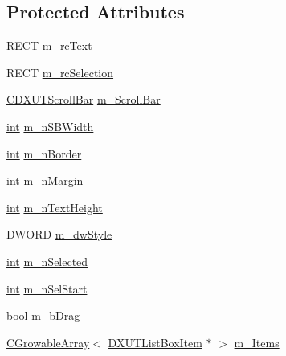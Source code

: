 \subsection*{Protected Attributes}
\begin{DoxyCompactItemize}
\item 
RECT \hyperlink{class_c_d_x_u_t_list_box_a2dea32bd9a82138ae549084e74b030ef}{m\_\-rcText}
\item 
RECT \hyperlink{class_c_d_x_u_t_list_box_a57972e758fd19f1cd23c9e9bc41745c7}{m\_\-rcSelection}
\item 
\hyperlink{class_c_d_x_u_t_scroll_bar}{CDXUTScrollBar} \hyperlink{class_c_d_x_u_t_list_box_a927146f380016cfc8b580b6f540648aa}{m\_\-ScrollBar}
\item 
\hyperlink{_d_x_u_tgui_8cpp_a2d77ed03302b6978834ee3b6f57837fb}{int} \hyperlink{class_c_d_x_u_t_list_box_a30975b84ea9afb7aa63c4572579b8e42}{m\_\-nSBWidth}
\item 
\hyperlink{_d_x_u_tgui_8cpp_a2d77ed03302b6978834ee3b6f57837fb}{int} \hyperlink{class_c_d_x_u_t_list_box_a1e089c11156f403da3af68a1e1766363}{m\_\-nBorder}
\item 
\hyperlink{_d_x_u_tgui_8cpp_a2d77ed03302b6978834ee3b6f57837fb}{int} \hyperlink{class_c_d_x_u_t_list_box_ae7d0e16e914553aaac60138bd4728b15}{m\_\-nMargin}
\item 
\hyperlink{_d_x_u_tgui_8cpp_a2d77ed03302b6978834ee3b6f57837fb}{int} \hyperlink{class_c_d_x_u_t_list_box_af21c0d22f870efc2575a16941f0c400a}{m\_\-nTextHeight}
\item 
DWORD \hyperlink{class_c_d_x_u_t_list_box_a0d9213ef6a8785539a01a54720163813}{m\_\-dwStyle}
\item 
\hyperlink{_d_x_u_tgui_8cpp_a2d77ed03302b6978834ee3b6f57837fb}{int} \hyperlink{class_c_d_x_u_t_list_box_aa9e2d7803e0006547b19e2cd10e73975}{m\_\-nSelected}
\item 
\hyperlink{_d_x_u_tgui_8cpp_a2d77ed03302b6978834ee3b6f57837fb}{int} \hyperlink{class_c_d_x_u_t_list_box_adfe5728a9319f94e542fd29d1c486956}{m\_\-nSelStart}
\item 
bool \hyperlink{class_c_d_x_u_t_list_box_aae46a4317bf8f102b191caa817e0e113}{m\_\-bDrag}
\item 
\hyperlink{class_c_growable_array}{CGrowableArray}$<$ \hyperlink{struct_d_x_u_t_list_box_item}{DXUTListBoxItem} $\ast$ $>$ \hyperlink{class_c_d_x_u_t_list_box_ad238fcc6b420d21cdb320779f93436f5}{m\_\-Items}
\end{DoxyCompactItemize}


